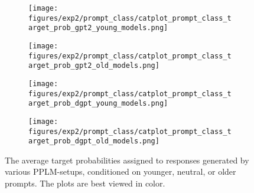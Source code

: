 \begin{figure}[H]
     \centering
     \begin{subfigure}[b]{0.48\textwidth}
        \centering
        \texttt{[image: figures/exp2/prompt\_class/catplot\_prompt\_class\_target\_prob\_gpt2\_young\_models.png]}
        \caption{}
        \label{subfig:catplot_prompt_class_target_prob_gpt2_young}
     \end{subfigure}
     \quad
     \begin{subfigure}[b]{0.48\textwidth}
        \centering
        \texttt{[image: figures/exp2/prompt\_class/catplot\_prompt\_class\_target\_prob\_gpt2\_old\_models.png]}
        \caption{}
        \label{subfig:catplot_prompt_class_target_prob_gpt2_old}
     \end{subfigure}
    \medskip
    \begin{subfigure}[b]{0.48\textwidth}
        \centering
        \texttt{[image: figures/exp2/prompt\_class/catplot\_prompt\_class\_target\_prob\_dgpt\_young\_models.png]}
        \caption{}
        \label{subfig:catplot_prompt_class_target_prob_dgpt_young}
     \end{subfigure}
    \quad
     \begin{subfigure}[b]{0.48\textwidth}
        \centering
        \texttt{[image: figures/exp2/prompt\_class/catplot\_prompt\_class\_target\_prob\_dgpt\_old\_models.png]}
        \caption{}
        \label{subfig:catplot_prompt_class_target_prob_dgpt_old}
     \end{subfigure}
    \caption{The average target probabilities assigned to responses generated by various PPLM-setups, conditioned on younger, neutral, or older prompts. The plots are best viewed in color.}
    \label{fig:catplot_prompt_class_target_prob}
\end{figure}

